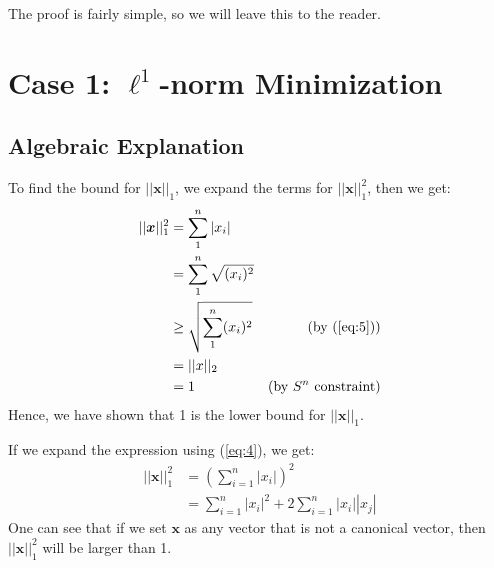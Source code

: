 \documentclass[11pt]{article}
\begin{document}
The proof is fairly simple, so we will leave this to the reader.


\section{Case 1: $\ell^1$-norm Minimization}

\subsection{Algebraic Explanation}
To find the bound for $||\bm{x}||_1$, we expand the terms for $||\bm{x}||_1^2$, then we get:
\begin{align*}
    ||\bm{x}||_1^2 
        &= \sum^n_1 |x_i| \\
        &= \sum^n_1 \sqrt{(x_i)^2} \\
        &\geq \sqrt{\sum^n_1 (x_i)^2} & \text{(by (\ref{eq:5}))}\\
        &= ||x||_2 \\
        &= 1 & \text{(by $S^n$ constraint)}
\end{align*}
Hence, we have shown that 1 is the lower bound for $||\bm{x}||_1$.

If we expand the expression using (\ref{eq:4}), we get:
\begin{align*}
    ||\bm{x}||_1^2
        &= (\sum^n_{i=1}|x_i|)^2 \\
        &= \sum^n_{i=1} |x_i|^2 + 2 \sum^n_{i=1}|x_i||x_j|
\end{align*}
One can see that if we set $\bm{x}$ as any vector that is not a canonical vector, then $||\bm{x}||_1^2$ will be larger than 1. 
\end{document}
